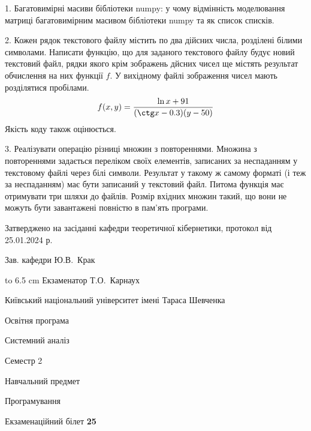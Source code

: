 \documentclass[12pt, ukrainian]{article}
\begin{document}
{%
1. Багатовимірні масиви бібліотеки numpy: у чому відмінність моделювання матриці багатовимірним масивом бібліотеки numpy та як список списків.%
\par
\vspace{2mm}

2. Кожен рядок текстового файлу містить по два дійсних числа, розділені білими символами.
Написати функцію, що для заданого текстового файлу будує новий текстовий файл, рядки якого крім зображень дйсних чисел ще містять результат обчислення на них функції $f$. У вихідному файлі зображення чисел мають розділятися пробілами. 
$$f(x, y) =\frac{\ln x + 91}{(\ctg x - 0.3) (y - 50)}$$ 
Якість коду також оцінюється.

\par
\vspace{2mm}

3. Реалізувати операцію різниці множин з повтореннями. Множина з повтореннями задається переліком своїх елементів, записаних за неспаданням у текстовому файлі через білі символи. Результат у такому ж самому форматі (і теж за неспаданням) має бути записаний у текстовий файл. Питома функція має отримувати три шляхи до файлів. Розмір вхідних множин такий, що вони не можуть бути завантажені повністю в пам’ять програми.

}
{\smallskip\smallskip \begin {scriptsize} Затверджено на засіданні кафедри теоретичної кібернетики, протокол   від   25.01.2024 р.\par\smallskip\smallskip\smallskip\smallskip
{\parbox {6.5 cm} {Зав. кафедри \dotfill Ю.В.~Крак}}\hspace {0.7cm} {\hbox to 6.5 cm { Екзаменатор \dotfill Т.О.~Карнаух}} \end{scriptsize}}
\newpage
{{\begin {scriptsize}\par
{ \center  Київський національний університет імені Тараса Шевченка \par}
{\parbox {5 cm}{Освітня програма \hfill}{\parbox {7 cm}{Системний аналіз\hfill}}\parbox {6 cm}{\hfill Семестр 2}}\par
{\parbox {5 cm} {Навчальний предмет \hfill}\parbox {7 cm}{Програмування \hfill}\parbox {6cm}{\hfill}\par}\vspace{-15pt} \end{scriptsize}}{\center Екзаменаційний білет \No \textbf { 25 }\par}}
\end{document}
